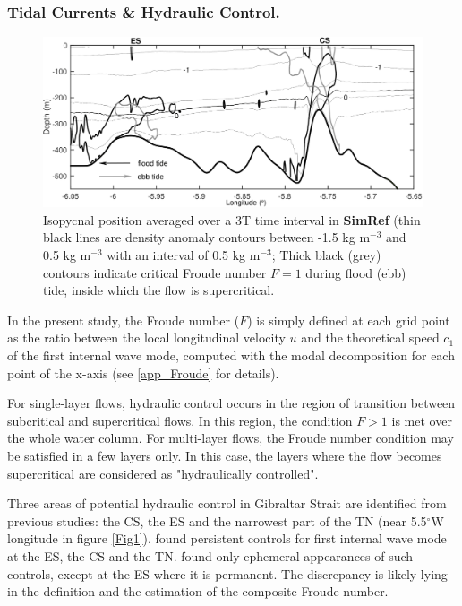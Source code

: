 \subsubsection{Tidal Currents \& Hydraulic Control.}
\label{tide_hyd}
\begin{figure}[!h]
\centering
\includegraphics[width=1\linewidth]{./GBR2D/figure5.png}
\caption[Isopycnal position averaged over time and critical Froude number.]{ Isopycnal position averaged over a 3T time interval in \textbf{SimRef} (thin black lines are density anomaly contours between -1.5 kg m$^{-3}$ and 0.5 kg m$^{-3}$ with an interval of 0.5 kg m$^{-3}$;  
Thick black (grey) contours indicate critical Froude number $F=1$ during flood (ebb) tide, inside which the flow is supercritical.}
\label{fig_fn_ref}
\end{figure}


In the present study, the Froude number ($F$) is simply defined at each grid point as the ratio between the local longitudinal velocity $u$ and the theoretical speed $c_1$ of the first internal wave mode, computed with the modal decomposition for each point of the x-axis (see \ref{app_Froude} for details).

For single-layer flows, hydraulic control occurs in the region of transition between subcritical and supercritical flows. In this region, the condition $F>1$ is met over the whole water column. For multi-layer flows, the Froude number condition may be satisfied in a few layers only. In this case, the layers where the flow becomes supercritical are considered as "hydraulically controlled".

Three areas of potential hydraulic control in Gibraltar Strait are identified from previous studies: the CS, the ES and the narrowest part of the TN (near 5.5$^\circ$W longitude in figure \ref{Fig1}). \citet{FA1988} found persistent controls for first internal wave mode at the ES, the CS and the TN. \citet{Sannino2009b} found only ephemeral appearances of such controls, except at the ES where it is permanent. The discrepancy is likely lying in the definition and the estimation of the composite Froude number.


